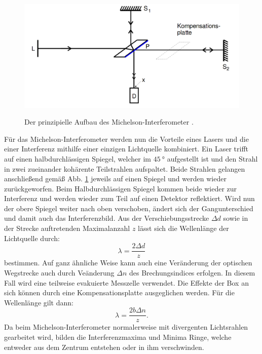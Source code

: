   \begin{figure}
  	\centering
  	\caption{Der prinzipielle Aufbau des Michelson-Interferometer \cite{V401}.}
  	\includegraphics[width=\linewidth-150pt,height=\textheight-150pt,keepaspectratio]{content/theoriebau.png}
  	\label{fig:aufbauth}
  \end{figure}
  Für das Michelson-Interferometer werden nun die Vorteile eines Lasers und die einer Interferenz mithilfe einer einzigen Lichtquelle kombiniert. Ein Laser trifft
  auf einen halbdurchlässigen Spiegel, welcher im $\SI{45}{\degree}$ aufgestellt ist und
  den Strahl in zwei zueinander kohärente Teilstrahlen aufspaltet. Beide Strahlen gelangen anschließend
  gemäß Abb. \ref{fig:aufbauth} jeweils auf einen Spiegel und werden wieder zurückgeworfen. Beim
  Halbdurchlässigen Spiegel kommen beide wieder zur Interferenz und werden wieder zum Teil auf
  einen Detektor reflektiert. Wird nun der obere Spiegel weiter nach oben verschoben,
  ändert sich der Gangunterschied und damit auch das Interferenzbild. Aus der Verschiebungsstrecke
  $\Delta d$ sowie in der Strecke auftretenden Maximalanzahl $z$ lässt sich die Wellenlänge der Lichtquelle durch:
  \begin{equation}
    \lambda = \frac{2 \Delta d}{z}\label{lambda}
    \end{equation}
    bestimmen. Auf ganz ähnliche Weise kann auch eine Veränderung der optischen Wegstrecke
     auch durch Veänderung $\Delta n$ des Brechungsindices erfolgen. In diesem Fall wird eine teilweise evakuierte Messzelle verwendet.
     Die Effekte der Box an sich können durch eine Kompensationsplatte ausgeglichen werden. Für die Wellenlänge gilt dann:
     \begin{equation}
       \lambda = \frac{2 b \Delta n }{z}\text{.}\label{nausdeltan}
       \end{equation}
Da beim Michelson-Interferometer normalerweise mit divergenten Lichtsrahlen gearbeitet wird,
bilden die Interferenzmaxima und Minima Ringe, welche entweder aus dem Zentrum entstehen oder in ihm verschwinden.
